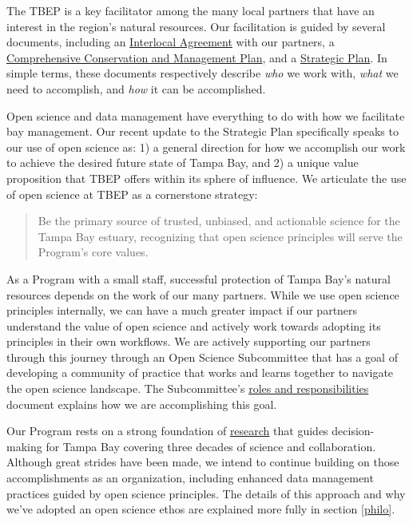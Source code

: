 \documentclass[
]{book}
\begin{document}
The TBEP is a key facilitator among the many local partners that have an interest in the region's natural resources. Our facilitation is guided by several documents, including an \href{https://drive.google.com/file/d/1iJcWxmc5SeyDTqiCQ3MLQGWEY_EDGtZT/view?usp=sharing}{Interlocal Agreement} with our partners, a \href{https://indd.adobe.com/view/cf7b3c48-d2b2-4713-921c-c2a0d4466632}{Comprehensive Conservation and Management Plan}, and a \href{https://drive.google.com/file/d/11xohuoaHDxNHRqgXoOHdI37FpWvac_rn/view?usp=sharing}{Strategic Plan}. In simple terms, these documents respectively describe \emph{who} we work with, \emph{what} we need to accomplish, and \emph{how} it can be accomplished.

Open science and data management have everything to do with how we facilitate bay management. Our recent update to the Strategic Plan specifically speaks to our use of open science as: 1) a general direction for how we accomplish our work to achieve the desired future state of Tampa Bay, and 2) a unique value proposition that TBEP offers within its sphere of influence. We articulate the use of open science at TBEP as a cornerstone strategy:

\begin{quote}
Be the primary source of trusted, unbiased, and actionable science for the Tampa Bay estuary, recognizing that open science principles will serve the Program's core values.
\end{quote}

As a Program with a small staff, successful protection of Tampa Bay's natural resources depends on the work of our many partners. While we use open science principles internally, we can have a much greater impact if our partners understand the value of open science and actively work towards adopting its principles in their own workflows. We are actively supporting our partners through this journey through an Open Science Subcommittee that has a goal of developing a community of practice that works and learns together to navigate the open science landscape. The Subcommittee's \href{https://docs.google.com/document/d/1w6dVTwfYYDRVzGPXy0jyHxV4mwOutEY_ISMP1oAdZ_c/edit}{roles and responsibilities} document explains how we are accomplishing this goal.

Our Program rests on a strong foundation of \href{https://tbep.org/our-work/library/}{research} that guides decision-making for Tampa Bay covering three decades of science and collaboration. Although great strides have been made, we intend to continue building on those accomplishments as an organization, including enhanced data management practices guided by open science principles. The details of this approach and why we've adopted an open science ethos are explained more fully in section \ref{philo}.
\end{document}
